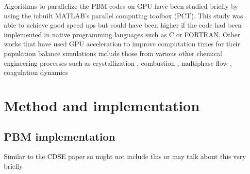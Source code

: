 \documentclass[preprint,10pt,authoryear]{elsarticle}
\begin{document}
\begin{linenumbers}
Algorithms to parallelize the PBM codes on GPU have been studied briefly by \cite{Prakash2013b} 
using the inbuilt MATLAB's parallel computing toolbox (PCT). This study was able to achieve 
good speed ups but could have been higher if the code had been implemented in native programming 
languages such as C or FORTRAN. Other works that have used GPU acceleration to improve computation 
times for their population balance simulations include those from various other chemical engineering 
processes such as crystallization \citep{Szilagy2016}, combustion \citep{Shi2012}, multiphase flow 
\citep{santos2013}, coagulation dynamics \citep{Xu2015}


\section{Method and implementation}
\label{secMethods}
\subsection{PBM implementation}
Similar to the CDSE paper so might not include this or may talk about this very briefly



\end{linenumbers}
\end{document}

